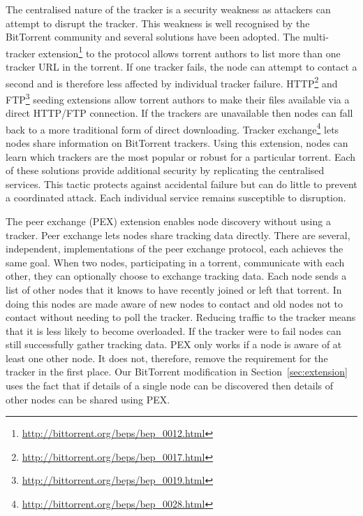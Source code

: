    The centralised nature of the tracker is a security weakness as attackers can attempt to disrupt the tracker. This weakness is well recognised by the BitTorrent community and several solutions have been adopted. The multi-tracker extension\footnote{\url{http://bittorrent.org/beps/bep_0012.html}} to the protocol allows torrent authors to list more than one tracker URL in the torrent. If one tracker fails, the node can attempt to contact a second and is therefore less affected by individual tracker failure. HTTP\footnote{\url{http://bittorrent.org/beps/bep_0017.html}} and FTP\footnote{\url{http://bittorrent.org/beps/bep_0019.html}} seeding extensions allow torrent authors to make their files available via a direct HTTP/FTP connection. If the trackers are unavailable then nodes can fall back to a more traditional form of direct downloading. Tracker exchange\footnote{\url{http://bittorrent.org/beps/bep_0028.html}} lets nodes share information on BitTorrent trackers. Using this extension, nodes can learn which trackers are the most popular or robust for a particular torrent. Each of these solutions provide additional security by replicating the centralised services. This tactic protects against accidental failure but can do little to prevent a coordinated attack. Each individual service remains susceptible to disruption.

    The peer exchange (PEX) \cite{Wu} extension enables node discovery without using a tracker. Peer exchange lets nodes share tracking data directly. There are several, independent, implementations of the peer exchange protocol\cite{Wu}, each achieves the same goal. When two nodes, participating in a torrent, communicate with each other, they can optionally choose to exchange tracking data. Each node sends a list of other nodes that it knows to have recently joined or left that torrent. In doing this nodes are made aware of new nodes to contact and old nodes not to contact without needing to poll the tracker. Reducing traffic to the tracker means that it is less likely to become overloaded. If the tracker were to fail nodes can still successfully gather tracking data. PEX only works if a node is aware of at least one other node. It does not, therefore, remove the requirement for the tracker in the first place. Our BitTorrent modification in Section~\ref{sec:extension} uses the fact that if details of a single node can be discovered then details of other nodes can be shared using PEX.

